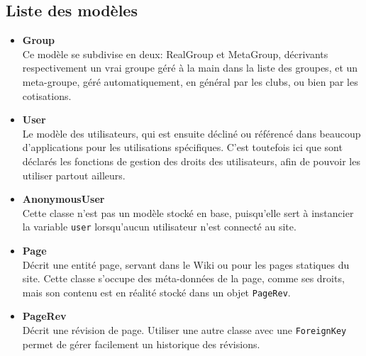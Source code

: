 \documentclass[a4paper]{report}
\begin{document}
\subsection{Liste des modèles}
\label{sub:liste_des_modeles}
\begin{itemize}
    \item \textbf{Group} \\
        Ce modèle se subdivise en deux: RealGroup et MetaGroup, décrivants respectivement un vrai groupe géré à la main
        dans la liste des groupes, et un meta-groupe, géré automatiquement, en général par les clubs, ou bien par les
        cotisations.
    \item \textbf{User} \\
        Le modèle des utilisateurs, qui est ensuite décliné ou référencé dans beaucoup d'applications pour les
        utilisations spécifiques. C'est toutefois ici que sont déclarés les fonctions de gestion des droits des
        utilisateurs, afin de pouvoir les utiliser partout ailleurs.
    \item \textbf{AnonymousUser} \\
        Cette classe n'est pas un modèle stocké en base, puisqu'elle sert à instancier la variable \verb#user#
        lorsqu'aucun utilisateur n'est connecté au site.
    \item \textbf{Page} \\
        Décrit une entité page, servant dans le Wiki ou pour les pages statiques du site. Cette classe s'occupe des
        méta-données de la page, comme ses droits, mais son contenu est en réalité stocké dans un objet \verb#PageRev#.
    \item \textbf{PageRev} \\
        Décrit une révision de page. Utiliser une autre classe avec une \verb#ForeignKey# permet de gérer facilement un
        historique des révisions.
\end{itemize}
\end{document}
